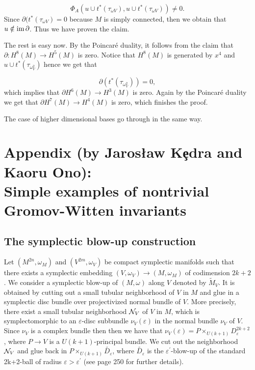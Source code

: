 \documentclass[a4paper,14pt]{article}
\newcommand{\C}[1]{{\cal #1}}
\newcommand{\om}{{\omega}}
\newcommand{\eps}{{\varepsilon}}
\newcommand{\del}{\partial}
\newcommand{\qed}{\rightline {$\Box $}}
\newcommand{\Mo}{(M,\omega )}
\newcommand{\im}{\text {im \!}}
\newcommand{\blowMV}{\widetilde {M}_V}
\newcommand{\BS}{{\bigskip}}
\newcommand{\NI}{{\noindent}}
\numberwithin{equation}{section}
\begin{document}
$$
\Phi _A(u \cup t^*(\tau _{\om V}),u \cup t^*(\tau _{\om V}))\neq 0.
$$
Since $\del (t^*(\tau _{\om V})=0$ because $M$ is simply connected, 
then we obtain that $u\notin \im \del $. Thus we have proven
the claim.

The rest is easy now. By the Poincar\' e duality, it follows
from the claim that $\del :H^8(M)\to H^5(M)$ is zero.
Notice that $H^8(M)$ is generated by $x^4$ and 
$u \cup t^*(\tau _{\om _V^2})$ hence we get that

$$
\del (t^*(\tau _{\om _V^2})) = 0,
$$
which implies that $\del H^6(M)\to H^3(M)$ is zero.
Again by the Poincar\' e duality we get that
$\del H^7(M)\to H^4(M)$ is zero, which finishes
the proof.

The case of higher dimensional bases go through
in the same way.

\qed

\BS



\appendix
\NI
\section{ Appendix (by Jaros\l aw K\c edra and Kaoru Ono):\\
 Simple examples of nontrivial Gromov-Witten invariants }

\BS


\subsection{The symplectic blow-up construction}

\BS

Let $(M^{2n},\om _M)$ and $(V^{2m},\omega _V)$ be compact
symplectic manifolds such that there exists
a symplectic embedding $(V,\om _V)\to (M,\om _M) $ of codimension
$2k + 2$. We consider a symplectic blow-up of $\Mo $
along $V$ denoted by $\blowMV$.
It is obtained by cutting
out a small tubular neighborhood of $V$ in $M$ and
glue in a symplectic disc bundle over projectivized
normal bundle of $V$. More precisely, there exist a small
tubular neighborhood $\C N_V$ of $V$ in $M$, which is symplectomorphic
to an $\eps $-disc subbundle $\nu _V(\eps )$
in the normal bundle $\nu _V$
of $V$. Since $\nu _V$ is a complex bundle then
then we have that
$\nu _V(\eps )=P\times _{U(k+1)}D^{2k+2}_{\eps }$,
where $P\to V$ is a $U(k+1)$-principal bundle.
We cut out the neighborhood $\C N_V$ and glue back in
$P\times _{U(k+1)}\widetilde {D_{\eps }}$, where
$\widetilde {D_{\eps }}$ is the $\eps ^{\prime }$-blow-up
of the standard 2k+2-ball of radius $\eps >\eps ^{\prime }$
(see \cite{ms1} page 250 for further details).
\end{document}
